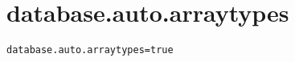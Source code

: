 \section{database.auto.arraytypes}
\label{configuration:DatabaseAutoArraytypes}
\AvailableInJavaOnly{\TODO}
\begin{lstlisting}[style=Props,caption={Usage example for \textit{database.auto.arraytypes}}]
database.auto.arraytypes=true
\end{lstlisting}